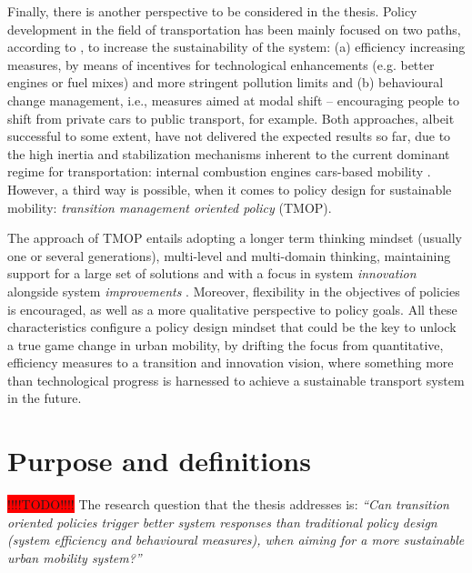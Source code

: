 \documentclass[a4paper,fontsize=10pt,bibliography=totoc]{scrartcl}
\begin{document}
\begin{multicols}{2}
Finally, there is another perspective to be considered in the thesis. Policy development in the field of transportation has been mainly focused on two paths, according to \textcite{koehler2009_transitionsmodelsustainable}, to increase the sustainability of the system: (a) efficiency increasing measures, by means of incentives for technological enhancements (e.g. better engines or fuel mixes) and more stringent pollution limits and (b) behavioural change management, i.e., measures aimed at modal shift -- encouraging people to shift from private cars to public transport, for example. Both approaches, albeit successful to some extent, have not delivered the expected results so far, due to the high inertia and stabilization mechanisms inherent to the current dominant regime for transportation: internal combustion engines cars-based mobility \parencite{geels2012_AutomobilityTransitionSocio}. However, a third way is possible, when it comes to policy design for sustainable mobility: \textit{transition management oriented policy} (TMOP).

The approach of TMOP entails adopting a longer term thinking mindset (usually one or several generations), multi-level and multi-domain thinking, maintaining support for a large set of solutions and with a focus in system \textit{innovation} alongside system \textit{improvements} \parencite{rotmans2001_Moreevolutionthan}. Moreover, flexibility in the objectives of policies is encouraged, as well as a more qualitative perspective to policy goals. All these characteristics configure a policy design mindset that could be the key to unlock a true game change in urban mobility, by drifting the focus from quantitative, efficiency measures to a transition and innovation vision, where something more than technological progress is harnessed to achieve a sustainable transport system in the future.

\section{Purpose and definitions}
\colorbox{red}{!!!!TODO!!!!}
The research question that the thesis addresses is: \textit{``Can transition oriented policies trigger better system responses than traditional policy design (system efficiency and behavioural measures), when aiming for a more sustainable urban mobility system?''}


\end{multicols}
\end{document}
